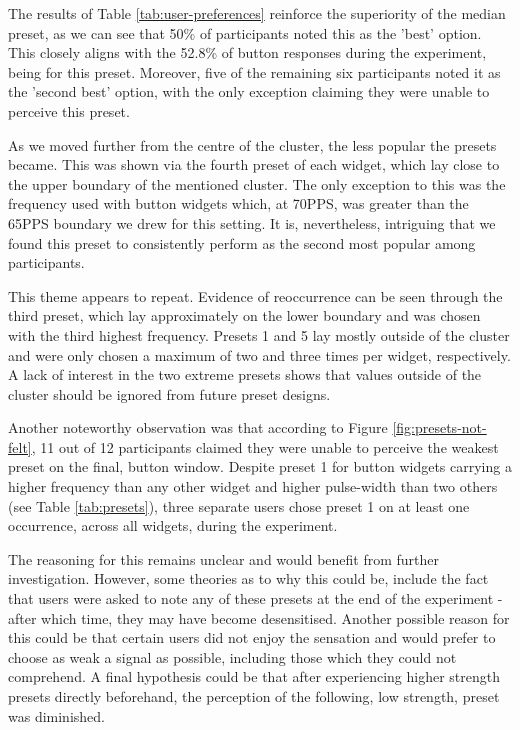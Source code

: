 \documentclass{mpaper}
\begin{document}
The results of Table \ref{tab:user-preferences} reinforce the superiority of the median preset, as we can see that 50\% of participants noted this as the 'best' option. This closely aligns with the 52.8\% of button responses during the experiment, being for this preset. Moreover, five of the remaining six participants noted it as the 'second best' option, with the only exception claiming they were unable to perceive this preset.

As we moved further from the centre of the cluster, the less popular the presets became. This was shown via the fourth preset of each widget, which lay close to the upper boundary of the mentioned cluster. The only exception to this was the frequency used with button widgets which, at 70PPS, was greater than the 65PPS boundary we drew for this setting. It is, nevertheless, intriguing that we found this preset to consistently perform as the second most popular among participants. 

This theme appears to repeat. Evidence of reoccurrence can be seen through the third preset, which lay approximately on the lower boundary and was chosen with the third highest frequency. Presets 1 and 5 lay mostly outside of the cluster and were only chosen a maximum of two and three times per widget, respectively. A lack of interest in the two extreme presets shows that values outside of the cluster should be ignored from future preset designs.

Another noteworthy observation was that according to Figure \ref{fig:presets-not-felt}, 11 out of 12 participants claimed they were unable to perceive the weakest preset on the final, button window. Despite preset 1 for button widgets carrying a higher frequency than any other widget and higher pulse-width than two others (see Table \ref{tab:presets}), three separate users chose preset 1 on at least one occurrence, across all widgets, during the experiment.

The reasoning for this remains unclear and would benefit from further investigation. However, some theories as to why this could be, include the fact that users were asked to note any of these presets at the end of the experiment - after which time, they may have become desensitised. Another possible reason for this could be that certain users did not enjoy the sensation and would prefer to choose as weak a signal as possible, including those which they could not comprehend. A final hypothesis could be that after experiencing higher strength presets directly beforehand, the perception of the following, low strength, preset was diminished.
\end{document}
